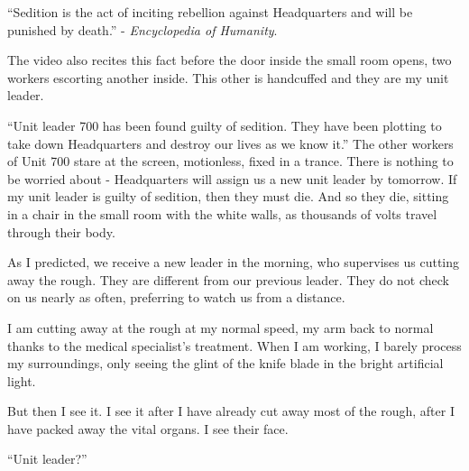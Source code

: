 \hspace{1.5em}
\parbox{0.9\textwidth}{
“Sedition is the act of inciting rebellion against Headquarters and will be punished by death.” - \textit{Encyclopedia of Humanity}.}
\vspace{1em}

The video also recites this fact before the door inside the small room opens, two workers escorting another inside. 
This other is handcuffed and they are my unit leader. 

“Unit leader 700 has been found guilty of sedition. They have been plotting to take down Headquarters and destroy our lives as we know it.”
The other workers of Unit 700 stare at the screen, motionless, fixed in a trance. There is nothing to be worried about - Headquarters will assign us a new unit leader by tomorrow. 
If my unit leader is guilty of sedition, then they must die.
And so they die, sitting in a chair in the small room with the white walls, as thousands of volts travel through their body.

As I predicted, we receive a new leader in the morning, who supervises us cutting away the rough. They are different from our previous leader. They do not check on us nearly as often, preferring to watch us from a distance.

I am cutting away at the rough at my normal speed, my arm back to normal thanks to the medical specialist’s treatment. When I am working, I barely process my surroundings, only seeing the glint of the knife blade in the bright artificial light.

But then I see it. I see it after I have already cut away most of the rough, after I have packed away the vital organs. I see their face.

“Unit leader?”
